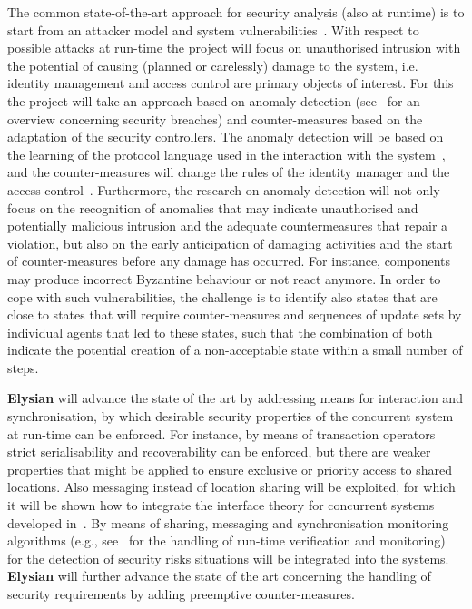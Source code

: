 \documentclass[a4paper,11pt]{article}
\newcommand{\project}[1]{\textbf{#1}\xspace}
\newcommand{\SECURITY}{\project{Elysian}}
\newcommand{\TheProject}{\SECURITY}
\begin{document}
The common state-of-the-art approach for security analysis (also at runtime) is to start from an attacker model and system vulnerabilities~\cite{Biskup09}. With respect to possible attacks at run-time the project will focus on unauthorised intrusion with the potential of causing (planned or carelessly) damage to the system, i.e. identity management and access control are primary objects of interest. For this the project will take an approach based on anomaly detection (see~\cite{BaileyCL14} for an overview concerning security breaches) and counter-measures based on the adaptation of the security controllers. The anomaly detection will be based on the learning of the protocol language used in the interaction with the system~\cite{Lampesberger13}, and the counter-measures will change the rules of the identity manager and the access control~\cite{BaileyCL14}. Furthermore, the research on anomaly detection will not only focus on the recognition of anomalies that may indicate unauthorised and potentially malicious intrusion and the adequate countermeasures that repair a violation, but also on the early anticipation of damaging activities and the start of counter-measures before any damage has occurred. For instance, components may produce incorrect Byzantine behaviour or not react anymore. In order to cope with such vulnerabilities, the challenge is to identify also states that are close to states that will require counter-measures and sequences of update sets by individual agents that led to these states, such that the combination of both indicate the potential creation of a non-acceptable state within a small number of steps. 

\begin{mdframed}[backgroundcolor=gray!10]
\TheProject{} will advance the state of the art by addressing means for interaction and synchronisation, by which desirable security properties of the concurrent system at run-time can be enforced. For instance, by means of transaction operators~\cite{BorgerSW16} strict serialisability and recoverability can be enforced, but there are weaker properties that might be applied to ensure exclusive or priority access to shared locations. Also messaging instead of location sharing will be exploited, for which it will be shown how to integrate the interface theory for concurrent systems developed in~\cite{BauerHW11}. By means of sharing, messaging and synchronisation monitoring algorithms (e.g., see~\cite{DiekertL14} for the handling of run-time verification and monitoring) for the detection of security risks situations will be integrated into the systems. \TheProject{} will further advance the state of the art concerning the handling of security requirements by adding preemptive counter-measures.
\end{mdframed}
\end{document}

